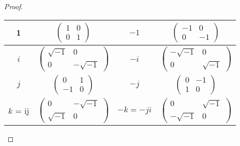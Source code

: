 \documentclass{article}
\begin{document}
\begin{proof}
    \vspace{1em}
    \begin{tabular}{ |c|c|c|c| } 
        \hline
        1 & $\begin{pmatrix}1 & 0 \\ 0 & 1\end{pmatrix}$ & $-1$ & $\begin{pmatrix}-1 & 0 \\ 0 & -1\end{pmatrix}$ \\
        \hline
        $i$ & $\begin{pmatrix}\sqrt{-1} & 0 \\ 0 & -\sqrt{-1}\end{pmatrix}$ & $-i$ & $\begin{pmatrix}-\sqrt{-1} & 0 \\ 0 & \sqrt{-1}\end{pmatrix}$ \\
        \hline
        $j$ & $\begin{pmatrix}0 & 1 \\ -1 & 0\end{pmatrix}$ & $-j$ & $\begin{pmatrix}0 & -1 \\ 1 & 0\end{pmatrix}$ \\
        \hline
        $k$ = ij & $\begin{pmatrix}0 & -\sqrt{-1} \\ \sqrt{-1} & 0\end{pmatrix}$ & $-k = -ji$ & $\begin{pmatrix}0 & \sqrt{-1} \\ -\sqrt{-1} & 0\end{pmatrix}$ \\
        \hline
    \end{tabular}
\end{proof}
\end{document}
